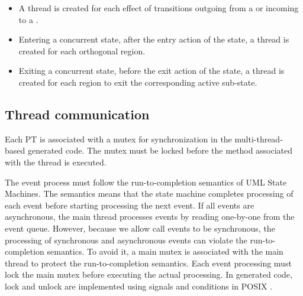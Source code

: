 {
\begin{itemize}
	\setlength\itemsep{-0.25em}
	\item A thread is created for each effect of transitions outgoing from a  or incoming to a .
	
	\item Entering a concurrent state, after the entry action of the state, a thread is created for each orthogonal region. 
	
	\item Exiting a concurrent state, before the exit action of the state, a thread is created for each region to exit the corresponding active sub-state.
	
\end{itemize}
}
\subsection{Thread communication}
\label{subsec:deadlock}
Each PT is associated with a mutex for synchronization in the multi-thread-based generated code. 
The mutex must be locked before the method associated with the thread is executed. 


\vskip 0.1cm
\noindent
{} The event process must follow the run-to-completion semantics of UML State Machines.
The semantics means that the state machine completes processing of each event before starting processing the next event. 
If all events are asynchronous, the main thread processes events by reading one-by-one from the event queue.
However, because we allow call events to be synchronous, the processing of synchronous and asynchronous events can violate the run-to-completion semantics.
To avoid it, a main mutex is associated with the main thread to protect the run-to-completion semantics. 
Each event processing must lock the main mutex before executing the actual processing. 
In generated code, lock and unlock are implemented using signals and conditions in POSIX \cite{Posix}.

\noindent


